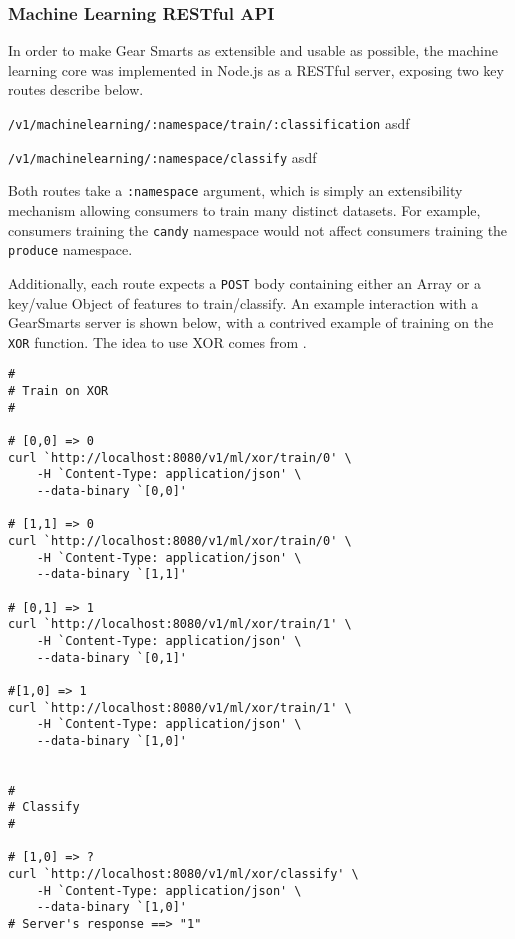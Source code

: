 \subsubsection{Machine Learning RESTful API}
\label{subsction:mlapi}
In order to make Gear Smarts as extensible and usable as possible, the machine learning core was implemented in Node.js
as a RESTful server, exposing two key routes describe below.

\begin{description}
    \item{\texttt{/v1/machinelearning/:namespace/train/:classification}} asdf
    \item{\texttt{/v1/machinelearning/:namespace/classify}} asdf
\end{description}

Both routes take a \texttt{:namespace} argument, which is simply an extensibility mechanism allowing consumers to train
many distinct datasets. For example, consumers training the \texttt{candy} namespace would not affect consumers training
the \texttt{produce} namespace.

Additionally, each route expects a \texttt{POST} body containing either an Array or a key/value Object of features to
train/classify. An example interaction with a GearSmarts server is shown below, with a contrived example of training
on the \texttt{XOR} function. The idea to use XOR comes from \cite{Github:nodesvm}.

\begin{lstlisting}
#
# Train on XOR
#

# [0,0] => 0
curl `http://localhost:8080/v1/ml/xor/train/0' \
    -H `Content-Type: application/json' \
    --data-binary `[0,0]'

# [1,1] => 0
curl `http://localhost:8080/v1/ml/xor/train/0' \
    -H `Content-Type: application/json' \
    --data-binary `[1,1]'

# [0,1] => 1
curl `http://localhost:8080/v1/ml/xor/train/1' \
    -H `Content-Type: application/json' \
    --data-binary `[0,1]'

#[1,0] => 1
curl `http://localhost:8080/v1/ml/xor/train/1' \
    -H `Content-Type: application/json' \
    --data-binary `[1,0]'


#
# Classify
#

# [1,0] => ?
curl `http://localhost:8080/v1/ml/xor/classify' \
    -H `Content-Type: application/json' \
    --data-binary `[1,0]'
# Server's response ==> "1"
\end{lstlisting}

